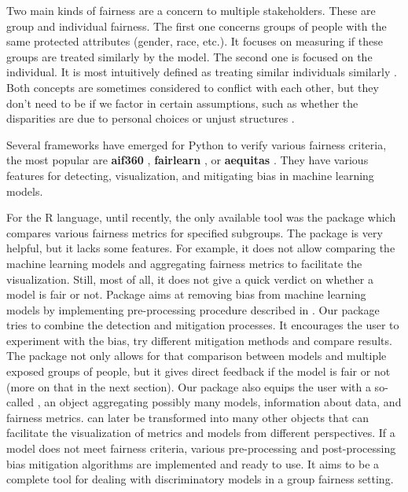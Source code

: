 Two main kinds of fairness are a concern to multiple stakeholders. These
are group and individual fairness. The first one concerns groups of
people with the same protected attributes (gender, race, etc.). It
focuses on measuring if these groups are treated similarly by the model.
The second one is focused on the individual. It is most intuitively
defined as treating similar individuals similarly
\citep{statisticalparity}. Both concepts are sometimes considered to
conflict with each other, but they don't need to be if we factor in
certain assumptions, such as whether the disparities are due to personal
choices or unjust structures \citep{reuben}.

Several frameworks have emerged for Python to verify various fairness
criteria, the most popular are \textbf{aif360} \citep{aif360-oct-2018},
\textbf{fairlearn} \citep{bird2020fairlearn}, or \textbf{aequitas}
\citep{2018aequitas}. They have various features for detecting,
visualization, and mitigating bias in machine learning models.

For the R language, until recently, the only available tool was the
 \citep{fairness} package which compares various
fairness metrics for specified subgroups. The  package is
very helpful, but it lacks some features. For example, it does not allow
comparing the machine learning models and aggregating fairness metrics
to facilitate the visualization. Still, most of all, it does not give a
quick verdict on whether a model is fair or not. Package
 aims at removing bias from machine learning models
by implementing pre-processing procedure described in
\citet{plecko2019fair}. Our package tries to combine the detection and
mitigation processes. It encourages the user to experiment with the
bias, try different mitigation methods and compare results. The package
 not only allows for that comparison between models and
multiple exposed groups of people, but it gives direct feedback if the
model is fair or not (more on that in the next section). Our package
also equips the user with a so-called , an
object aggregating possibly many models, information about data, and
fairness metrics.  can later be transformed
into many other objects that can facilitate the visualization of metrics
and models from different perspectives. If a model does not meet
fairness criteria, various pre-processing and post-processing bias
mitigation algorithms are implemented and ready to use. It aims to be a
complete tool for dealing with discriminatory models in a group fairness
setting.

